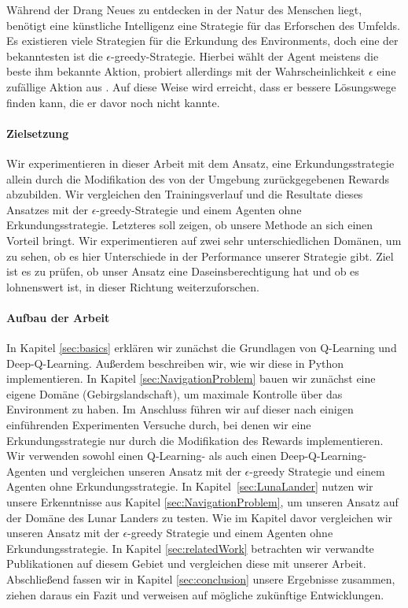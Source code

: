Während der Drang Neues zu entdecken in der Natur des Menschen liegt, benötigt eine künstliche Intelligenz eine Strategie für das Erforschen des Umfelds.
Es existieren viele Strategien für die Erkundung des Environments, doch eine der bekanntesten ist die $ \epsilon $-greedy-Strategie. Hierbei wählt der Agent meistens die beste ihm bekannte Aktion, probiert allerdings mit der Wahrscheinlichkeit $ \epsilon $ eine zufällige Aktion aus \cite{07_dabney2020temporallyextended, 06_sutton2018reinforcement}. Auf diese Weise wird erreicht, dass er bessere Lösungswege finden kann, die er davor noch nicht kannte.

\paragraph{Zielsetzung}
Wir experimentieren in dieser Arbeit mit dem Ansatz, eine Erkundungsstrategie allein durch die Modifikation des von der Umgebung zurückgegebenen Rewards abzubilden. Wir vergleichen den Trainingsverlauf und die Resultate dieses Ansatzes mit der $ \epsilon $-greedy-Strategie und einem Agenten ohne Erkundungsstrategie. Letzteres soll zeigen, ob unsere Methode an sich einen Vorteil bringt. Wir experimentieren auf zwei sehr unterschiedlichen Domänen, um zu sehen, ob es hier Unterschiede in der Performance unserer Strategie gibt. Ziel ist es zu prüfen, ob unser Ansatz eine Daseinsberechtigung hat und ob es lohnenswert ist, in dieser Richtung weiterzuforschen.

\paragraph{Aufbau der Arbeit}
In Kapitel \ref{sec:basics} erklären wir zunächst die Grundlagen von Q-Learning und Deep-Q-Learning. Außerdem beschreiben wir, wie wir diese in Python implementieren. In Kapitel \ref{sec:NavigationProblem} bauen wir zunächst eine eigene Domäne (Gebirgslandschaft), um maximale Kontrolle über das Environment zu haben. Im Anschluss führen wir auf dieser nach einigen einführenden Experimenten Versuche durch, bei denen wir eine Erkundungsstrategie nur durch die Modifikation des Rewards implementieren. Wir verwenden sowohl einen Q-Learning- als auch einen Deep-Q-Learning-Agenten und vergleichen unseren Ansatz mit der $ \epsilon $-greedy Strategie und einem Agenten ohne Erkundungsstrategie. In Kapitel~\ref{sec:LunaLander} nutzen wir unsere Erkenntnisse aus Kapitel \ref{sec:NavigationProblem}, um unseren Ansatz auf der Domäne des Lunar Landers zu testen. Wie im Kapitel davor vergleichen wir unseren Ansatz mit der $ \epsilon $-greedy Strategie und einem Agenten ohne Erkundungsstrategie. In Kapitel \ref{sec:relatedWork} betrachten wir verwandte Publikationen auf diesem Gebiet und vergleichen diese mit unserer Arbeit. Abschließend fassen wir in Kapitel \ref{sec:conclusion} unsere Ergebnisse zusammen, ziehen daraus ein Fazit und verweisen auf mögliche zukünftige Entwicklungen.